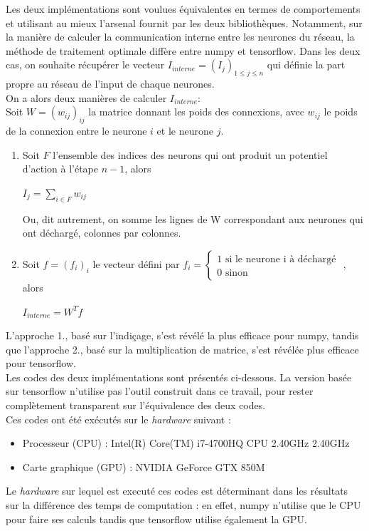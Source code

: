 \documentclass[12pt]{scrartcl}
\begin{document}
Les deux implémentations sont voulues équivalentes en termes de comportements et utilisant au mieux l'arsenal fournit par les deux bibliothèques. Notamment, sur la manière de calculer la communication interne entre les neurones du réseau, 
la méthode de traitement optimale diffère entre numpy et tensorflow. Dans les deux cas, on souhaite récupérer le vecteur $I_{interne} = (I_j)_{1\leq j \leq n}$ qui définie la part propre au réseau de l'input de chaque neurones.\\
On a alors deux manières de calculer $I_{interne}$:\\
Soit $W=(w_{ij})_{ij}$ la matrice donnant les poids des connexions, avec $w_{ij}$ le poids de la connexion entre le neurone $i$ et le neurone $j$.
\begin{enumerate}
\item Soit $F$ l'ensemble des indices des neurons qui ont produit un potentiel d'action à l'étape $n-1$, alors \begin{center} $I_j = \displaystyle \sum_{i\in F} w_{ij}$ \end{center}
Ou, dit autrement, on somme les lignes de W correspondant aux neurones qui ont déchargé, colonnes par colonnes.
\item Soit $f=(f_i)_i$ le vecteur défini par $f_i = \left\{\begin{array}{l} 1 \text{ si le neurone i à déchargé } \\ 0 \text{ sinon } \end{array}\right.$, alors \begin{center} $I_{interne} = \displaystyle W^T\dot f$ \end{center}
\end{enumerate}

L'approche 1., basé sur l'indiçage, s'est révélé la plus efficace pour numpy, tandis que l'approche 2., basé sur la multiplication de matrice, s'est révélée plus efficace pour tensorflow.\\

Les codes des deux implémentations sont présentés ci-dessous. La version basée sur tensorflow n'utilise pas l'outil construit dans ce travail, pour rester complètement transparent sur l'équivalence des deux codes. \\Ces codes ont été exécutés sur le \textit{hardware} suivant :
\begin{itemize}
\item Processeur (CPU) : Intel(R) Core(TM) i7-4700HQ CPU \@ 2.40GHz 2.40GHz
\item Carte graphique (GPU) : NVIDIA GeForce GTX 850M
\end{itemize}
Le \textit{hardware} sur lequel est executé ces codes est déterminant dans les résultats sur la différence des temps de computation : en effet, numpy n'utilise que le CPU pour faire ses calculs tandis que tensorflow utilise également la GPU.
\end{document}

